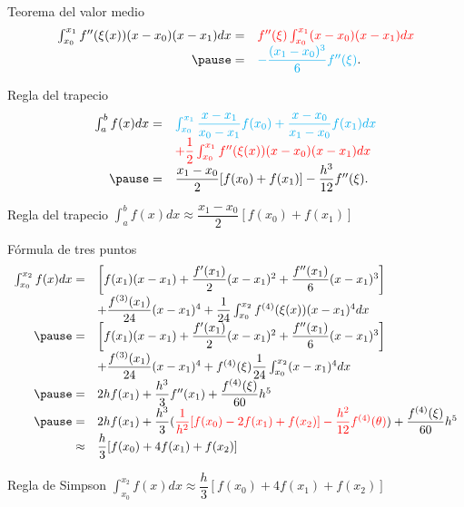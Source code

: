 \begin{frame}{Teorema del valor medio}
\begin{displaymath}
\begin{array}{rl}
\int_{x_0}^{x_1}f''(\xi(x))(x-x_0)(x-x_1)dx=&\textcolor{red}{f''(\xi)\int_{x_0}^{x_1}(x-x_0)(x-x_1)dx}\\\pause
=&\textcolor{cyan}{-\dfrac{(x_1-x_0)^3}{6}f''(\xi)}.
\end{array}
\end{displaymath}
\end{frame}
\begin{frame}{Regla del trapecio}
\begin{displaymath}
\begin{array}{rl}
\int_a^b f(x)dx=&\textcolor{cyan}{\int_{x_0}^{x_1} \dfrac{x-x_1}{x_0-x_1}f(x_0)+\dfrac{x-x_0}{x_1-x_0}f(x_1)dx}\\
&\textcolor{red}{+\dfrac{1}{2}\int_{x_0}^{x_1}f''(\xi(x))(x-x_0)(x-x_1)dx}\\\pause
=&\dfrac{x_1-x_0}{2}[f(x_0)+f(x_1)]-\dfrac{h^3}{12}f''(\xi).
\end{array}
\end{displaymath}
\begin{block}{Regla del trapecio}
\centering $\int_a^b f(x)dx\approx \dfrac{x_1-x_0}{2}[f(x_0)+f(x_1)]$
\end{block}
\end{frame}
\begin{frame}{Fórmula de tres puntos}
\small
\begin{displaymath}
\begin{array}{rl}
\int_{x_0}^{x_2} f(x)dx=&\bigg[f(x_1)(x-x_1)+\dfrac{f'(x_1)}{2}(x-x_1)^2+\dfrac{f''(x_1)}{6}(x-x_1)^3\bigg]\\
&+\dfrac{f^{(3)}(x_1)}{24}(x-x_1)^4+\dfrac{1}{24}\int_{x_0}^{x_2}f^{(4)}(\xi(x))(x-x_1)^4dx\\\pause
=&\bigg[f(x_1)(x-x_1)+\dfrac{f'(x_1)}{2}(x-x_1)^2+\dfrac{f''(x_1)}{6}(x-x_1)^3\bigg]\\
&+\dfrac{f^{(3)}(x_1)}{24}(x-x_1)^4+f^{(4)}(\xi)\dfrac{1}{24}\int_{x_0}^{x_2}(x-x_1)^4dx\\\pause
=&2hf(x_1)+\dfrac{h^3}{3}f''(x_1)+\dfrac{f^{(4)}(\xi)}{60}h^5\\\pause
=&2hf(x_1)+\dfrac{h^3}{3}(\textcolor{red}{\dfrac{1}{h^2}[f(x_0)-2f(x_1)+f(x_2)]-\dfrac{h^{2}}{12}f^{(4)}(\theta)})+\dfrac{f^{(4)}(\xi)}{60}h^5\\
\approx & \dfrac{h}{3}[f(x_0)+4f(x_1)+f(x_2)]
\end{array}
\end{displaymath}
\begin{block}{Regla de Simpson}
\centering $\int_{x_0}^{x_2} f(x)dx\approx \dfrac{h}{3}[f(x_0)+4f(x_1)+f(x_2)]$
\end{block}
\end{frame}
